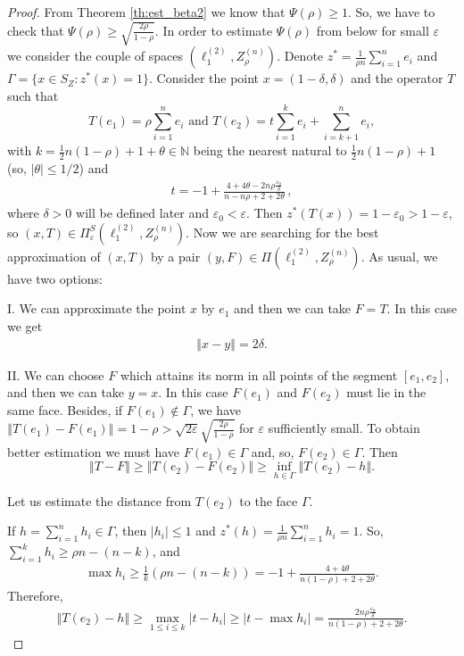 \documentclass[11pt,a4paper]{amsart}
\newcommand{\N}{{\mathbb{N}}}
\newcommand{\eps}{\varepsilon}
\newcommand{\norm}[1]{\left\Vert#1\right\Vert}
\numberwithin{equation}{section}
\theoremstyle{plain}
\theoremstyle{definition}
\renewcommand{\leq}{\leqslant}
\renewcommand{\geq}{\geqslant}
\begin{document}
\begin{proof} 
From Theorem \ref{th:est_beta2} we know that  $\Psi(\rho)\geq 1$. So, we have to check that $\Psi(\rho)\geq \sqrt{\frac{2\rho}{1-\rho}}$. 
In order to estimate  $\Psi(\rho)$  from below for small $\eps$ we consider the couple of spaces $(\ell_1^{(2)}, Z^{(n)}_\rho)$.
Denote $z^*=\frac{1}{\rho n}\sum \limits_{i=1}^{n}e_i$ and $\Gamma=\{x\in S_Z : z^*(x)=1\}$.
Consider the point $x=(1-\delta, \delta)$ and the operator $T$ such that 
$$T(e_1) = \rho\sum \limits_{i=1}^{n} e_i \,\,\text{and}\,\, T(e_2) =  t  \sum\limits_{i=1}^{k} e_i 
+\sum\limits_{i=k+1}^{n}e_i,$$
with  $k=\frac{1}{2}n(1-\rho)+1+\theta \in \N$ being the nearest natural to $\frac{1}{2}n(1-\rho)+1$ (so, $|\theta| \leq 1/2$) and
\begin{align}\label{eq_t}
t=-1+\frac{4+4\theta -2n\rho\frac{\eps_0}{\delta}}{n-n\rho+2+2\theta}\,,
\end{align}
where $\delta>0$ will be defined later and $\eps_0 < \eps$.
Then $z^*(T(x))=1-\eps_0>1-\eps$, so $(x, T)\in \Pi^S_\eps(\ell_1^{(2)}, Z^{(n)}_\rho)$. Now we are searching for the best approximation of $(x, T)$ by a pair $(y, F)\in \Pi(\ell_1^{(2)}, Z^{(n)}_\rho)$. As usual, we have two options: 


I. We can approximate the point $x$ by $e_1$ and then we can take $F=T$. In this case we get 
\begin{align}\label{eq_point}
\norm{x-y}=2\delta.
\end{align}

 
II. We can choose  $F$ which attains its norm in all points of the segment $[e_1, e_2]$, and then we can take $y=x$. In this case $F(e_1)$ and $F(e_2)$ must lie in the same face. Besides, if $F(e_1)\not\in \Gamma$,  we have $\norm{T(e_1)-F(e_1)}=1-\rho>\sqrt{2\eps}\sqrt{\frac{2\rho}{1-\rho}} $  for $\eps$ sufficiently small. To obtain better estimation we must have $F(e_1)\in\Gamma$ and, so, $F(e_2)\in\Gamma$. Then
$$\norm{T-F}\geq \norm{T(e_2)-F(e_2)}\geq \underset{h\in \Gamma}{\inf}\norm{T(e_2)-h}.$$

Let us estimate the distance from $T(e_2)$ to the face $\Gamma$. 

If $h=\sum\limits_{i=1}^{n}h_i \in \Gamma$, then $|h_i|\leq 1$ and $z^*(h)=\frac{1}{\rho n}\sum\limits_{i=1}^{n}h_i=1$. So, $\sum\limits_{i=1}^{k}h_i\geq \rho n -(n-k)$, and 
\begin{align*}
\max h_i \geq \frac{1}{k}(\rho n -(n-k))=-1+\frac{4+4\theta}{n(1-\rho)+2+2\theta}.
\end{align*}
Therefore, 
\begin{align}\label{eq_oper}
\norm{T(e_2)-h}\geq \underset{1\leq i\leq k}{\max}|t-h_i|\geq |t- \max h_i|= 
\frac{2n\rho\frac{\eps_0}{\delta}}{n(1-\rho)+2+2\theta}.
\end{align}


\end{proof}
\end{document}
